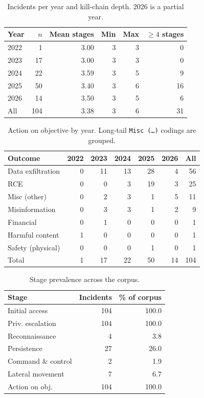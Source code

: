 
\begin{table}[t]
\centering
\caption{Incidents per year and kill-chain depth. 2026 is a partial year.}
\label{tab:per-year}
\begin{tabular}{lrrrrr}
\toprule
Year & $n$ & Mean stages & Min & Max & $\geq 4$ stages \\
\midrule
2022 & 1 & 3.00 & 3 & 3 & 0 \\
2023 & 17 & 3.00 & 3 & 3 & 0 \\
2024 & 22 & 3.59 & 3 & 5 & 9 \\
2025 & 50 & 3.40 & 3 & 6 & 16 \\
2026 & 14 & 3.50 & 3 & 5 & 6 \\
\midrule
All & 104 & 3.38 & 3 & 6 & 31 \\
\bottomrule
\end{tabular}
\end{table}

\begin{table}[t]
\centering
\caption{Action on objective by year. Long-tail \texttt{Misc (\ldots)} codings are grouped.}
\label{tab:outcome-year}
\begin{tabular}{lrrrrrr}
\toprule
Outcome & 2022 & 2023 & 2024 & 2025 & 2026 & All \\
\midrule
Data exfiltration & 0 & 11 & 13 & 28 & 4 & 56 \\
RCE & 0 & 0 & 3 & 19 & 3 & 25 \\
Misc (other) & 0 & 2 & 3 & 1 & 5 & 11 \\
Misinformation & 0 & 3 & 3 & 1 & 2 & 9 \\
Financial & 0 & 1 & 0 & 0 & 0 & 1 \\
Harmful content & 1 & 0 & 0 & 0 & 0 & 1 \\
Safety (physical) & 0 & 0 & 0 & 1 & 0 & 1 \\
\midrule
Total & 1 & 17 & 22 & 50 & 14 & 104 \\
\bottomrule
\end{tabular}
\end{table}

\begin{table}[t]
\centering
\caption{Stage prevalence across the corpus.}
\label{tab:prevalence}
\begin{tabular}{lrr}
\toprule
Stage & Incidents & \% of corpus \\
\midrule
Initial access & 104 & 100.0 \\
Priv. escalation & 104 & 100.0 \\
Reconnaissance & 4 & 3.8 \\
Persistence & 27 & 26.0 \\
Command \& control & 2 & 1.9 \\
Lateral movement & 7 & 6.7 \\
Action on obj. & 104 & 100.0 \\
\bottomrule
\end{tabular}
\end{table}

